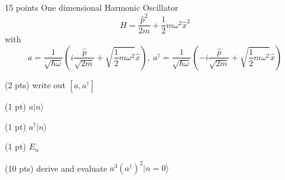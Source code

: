 \documentclass[UTF8,12pt]{article} %
\begin{document}
\begin{exercise}{15 points}{}
One dimensional Harmonic Oscillator
$$H = \frac{\hat{p}^{2}}{2m} + \frac{1}{2}m\omega^{2}\hat{x}^{2}$$
with
$$a = \frac{1}{\sqrt{\hbar\omega}}\left(i\frac{\hat{p}}{\sqrt{2m}} + \sqrt{\frac{1}{2}m\omega^{2}}\hat{x}\right),~ a^{\dag} = \frac{1}{\sqrt{\hbar\omega}}\left(-i\frac{\hat{p}}{\sqrt{2m}} + \sqrt{\frac{1}{2}m\omega^{2}}\hat{x}\right)$$
\begin{enumerate*}
\item (2 pts) write out $[a,a^{\dag}]$
\item (1 pt) $a|n\rangle$
\item (1 pt) $a^{\dag}|n\rangle$
\item (1 pt) $E_{n}$
\item (10 pts) derive and evaluate $a^{3}(a^{\dag})^{2}|n=0\rangle$
\end{enumerate*}
\end{exercise}
\end{document}
